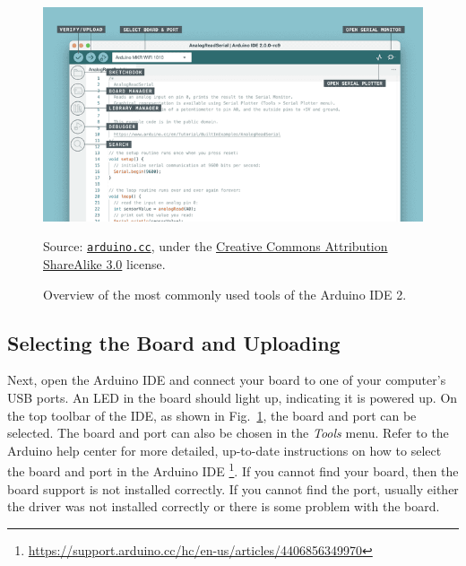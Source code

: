 \begin{figure}[b]
  \begin{wide}
    \centering
    \includegraphics[width=\textwidth]{img/ide-2-overview}%
    \\ \scriptsize
    \raggedright
    Source: \href{https://docs.arduino.cc/software/ide-v2/tutorials/getting-started-ide-v2/}{\texttt{arduino.cc}}, under the \href{https://creativecommons.org/licenses/by-sa/3.0/legalcode}{Creative Commons Attribution ShareAlike 3.0} license.
  \caption{Overview of the most commonly used tools of the Arduino IDE 2.}
  \label{fig:ide-2-overview}
  \end{wide}
\end{figure}

\subsection{Selecting the Board and Uploading}
Next, open the Arduino IDE and connect your board to one of your computer's USB ports.
An LED in the board should light up, indicating it is powered up.
On the top toolbar of the IDE, as shown in Fig.~\ref{fig:ide-2-overview}, the board and port can be selected.
The board and port can also be chosen in the \emph{Tools} menu.
Refer to the Arduino help center for more detailed, up-to-date instructions on how to select the board and port in the Arduino IDE%
\footnote{\url{https://support.arduino.cc/hc/en-us/articles/4406856349970}}.
If you cannot find your board, then the board support is not installed correctly.
If you cannot find the port, usually either the driver was not installed correctly or there is some problem with the board.

